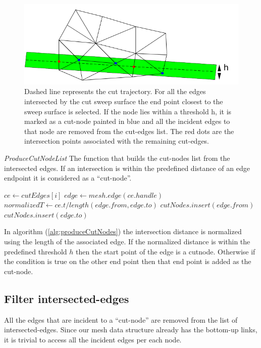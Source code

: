 \begin{figure}[H]
  \centering
  \includegraphics[width=0.8\linewidth]{figures/cutting/cutnode.png}
  \caption{\label{fig:cutnode}
  {Dashed line represents the cut trajectory. For all the edges intersected by the cut sweep surface the end point closest to the sweep surface is selected.
  If the node lies within a threshold h, it is marked as a cut-node painted in blue and all the incident edges to that node are removed from the cut-edges list.
  The red dots are the intersection points associated with the remaining cut-edges.}
}
\end{figure}

\begin{algorithm}[H]
\caption{\textit{ProduceCutNodeList} The function that builds the cut-nodes list from the intersected edges.
If an intersection is within the predefined distance of an edge endpoint it is considered as a ``cut-node''.}
\label{alg:produceCutNodes}
\begin{algorithmic}[1]	
  \STATE $ce \gets cutEdges\left[i\right]$
  \STATE $edge \gets mesh.edge(ce.handle)$
  \STATE $normalizedT \gets ce.t / length(edge.from, edge.to)$
  \STATE $cutNodes.insert(edge.from)$
  \ELSE
    \STATE $cutNodes.insert(edge.to)$
    \ENDIF
  \ENDIF
  \ENDFOR
\end{algorithmic}
\end{algorithm}

In algorithm (\ref{alg:produceCutNodes}) the intersection distance is normalized using the length of the associated edge.
If the normalized distance is within the predefined threshold $h$ then the start point of the edge is a cutnode. Otherwise
if the condition is true on the other end point then that end point is added as the cut-node.

\subsection{Filter intersected-edges}
All the edges that are incident to a ``cut-node'' are removed from the list of intersected-edges. Since our mesh data structure 
already has the bottom-up links, it is trivial to access all the incident edges per each node. 


